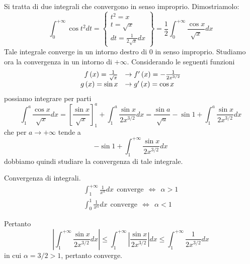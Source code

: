 Si tratta di due integrali che convergono in senso improprio. Dimostriamolo:
\begin{equation*}
\int\nolimits^{+ \infty}_{0}\cos t^{2} dt = \left\{
\begin{array}{c}
t^{2} = x\\
t = \sqrt{x}\\
dt = \frac{1}{2\sqrt{x}} dx
\end{array}\right\} = \frac{1}{2}\int\nolimits^{+ \infty}_{0}\frac{\cos x}{\sqrt{x}} dx
\end{equation*}
Tale integrale converge in un intorno destro di $0$ in senso improprio. Studiamo ora la convergenza in un intorno di $ + \infty $. Considerando le seguenti funzioni
\begin{equation*}
\begin{array}{r l}
f\left(x\right) = \frac{1}{\sqrt{x}} & \rightarrow f'\left(x\right) = - \frac{1}{2x^{3/2}}\\
g\left(x\right) = \sin x & \rightarrow g'\left(x\right) = \cos x
\end{array}
\end{equation*}
possiamo integrare per parti
\begin{equation*}
\int\nolimits^{a}_{1}\frac{\cos x}{\sqrt{x}} dx = \left[\frac{\sin x}{\sqrt{x}}\right]^{a}_{1} + \int\nolimits^{a}_{1}\frac{\sin x}{2x^{3/2}} dx = \frac{\sin a}{\sqrt{a}} - \sin 1 + \int\nolimits^{a}_{1}\frac{\sin x}{2x^{3/2}} dx
\end{equation*}
che per $a\rightarrow + \infty $ tende a
\begin{equation*}
- \sin 1 + \int\nolimits^{+ \infty}_{1}\frac{\sin x}{2x^{3/2}} dx
\end{equation*}
dobbiamo quindi studiare la convergenza di tale integrale.
\begin{rem}
Convergenza di integrali.
\begin{gather*}
\int\nolimits^{+ \infty}_{1}\frac{1}{x^{\alpha}} dx\ \ \text{converge} \ \ \iff \ \ \alpha  > 1\\
\int\nolimits^{1}_{0}\frac{1}{x^{\alpha}} dx\ \ \text{converge} \ \ \iff \ \ \alpha < 1
\end{gather*}
\end{rem}
Pertanto
\begin{equation*}
\left| \int\nolimits^{+ \infty}_{1}\frac{\sin x}{2x^{3/2}} dx\right| \leq \int\nolimits^{+ \infty}_{1}\left| \frac{\sin x}{2x^{3/2}}\right| dx \leq \int\nolimits^{+ \infty}_{1}\frac{1}{2x^{3/2}} dx
\end{equation*}
in cui $\alpha = 3/2 > 1$, pertanto converge.

